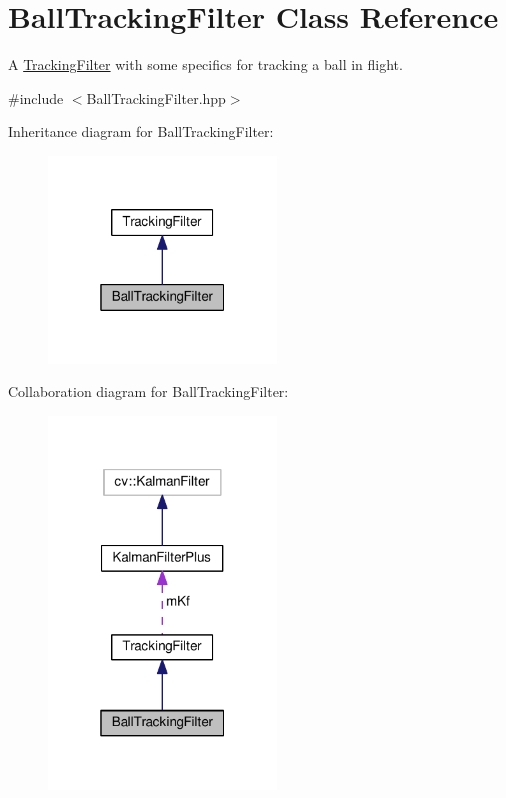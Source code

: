 \hypertarget{classBallTrackingFilter}{}\section{Ball\+Tracking\+Filter Class Reference}
\label{classBallTrackingFilter}


A \hyperlink{classTrackingFilter}{Tracking\+Filter} with some specifics for tracking a ball in flight.  




{\ttfamily \#include $<$Ball\+Tracking\+Filter.\+hpp$>$}



Inheritance diagram for Ball\+Tracking\+Filter\+:\nopagebreak
\begin{figure}[H]
\begin{center}
\leavevmode
\includegraphics[width=172pt]{classBallTrackingFilter__inherit__graph}
\end{center}
\end{figure}


Collaboration diagram for Ball\+Tracking\+Filter\+:\nopagebreak
\begin{figure}[H]
\begin{center}
\leavevmode
\includegraphics[width=172pt]{classBallTrackingFilter__coll__graph}
\end{center}
\end{figure}
